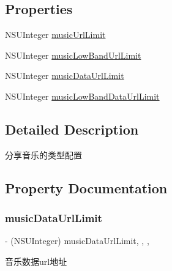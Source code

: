 \subsection*{Properties}
\begin{DoxyCompactItemize}
\item 
N\+S\+U\+Integer \mbox{\hyperlink{interface_u_m_social_share_music_object_config_a21282e2461e68673abd655fe16f59fab}{music\+Url\+Limit}}
\item 
N\+S\+U\+Integer \mbox{\hyperlink{interface_u_m_social_share_music_object_config_a24454ceb5feccd9f959b5a1f4102961c}{music\+Low\+Band\+Url\+Limit}}
\item 
N\+S\+U\+Integer \mbox{\hyperlink{interface_u_m_social_share_music_object_config_a6399faeafb7331ce81719aa8d6c73f64}{music\+Data\+Url\+Limit}}
\item 
N\+S\+U\+Integer \mbox{\hyperlink{interface_u_m_social_share_music_object_config_a14f8b4e112a041b78d06387fee62d147}{music\+Low\+Band\+Data\+Url\+Limit}}
\end{DoxyCompactItemize}


\subsection{Detailed Description}
分享音乐的类型配置 

\subsection{Property Documentation}
\mbox{\label{interface_u_m_social_share_music_object_config_a6399faeafb7331ce81719aa8d6c73f64}} 
\subsubsection{\texorpdfstring{music\+Data\+Url\+Limit}{musicDataUrlLimit}}
{\footnotesize\ttfamily -\/ (N\+S\+U\+Integer) music\+Data\+Url\+Limit\hspace{0.3cm}{\ttfamily [read]}, {\ttfamily [write]}, {\ttfamily [nonatomic]}, {\ttfamily [assign]}}

音乐数据url地址 \mbox{\label{interface_u_m_social_share_music_object_config_a14f8b4e112a041b78d06387fee62d147}} 

